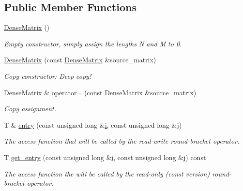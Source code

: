 \subsection*{Public Member Functions}
\begin{DoxyCompactItemize}
\item 
\hyperlink{classoomph_1_1DenseMatrix_aecfca835918b50b607e080fc706b6fcf}{Dense\+Matrix} ()
\begin{DoxyCompactList}\small\item\em Empty constructor, simply assign the lengths N and M to 0. \end{DoxyCompactList}\item 
\hyperlink{classoomph_1_1DenseMatrix_a1d8bf7ffb6cc91b882be17b25ff6d452}{Dense\+Matrix} (const \hyperlink{classoomph_1_1DenseMatrix}{Dense\+Matrix} \&source\+\_\+matrix)
\begin{DoxyCompactList}\small\item\em Copy constructor\+: Deep copy! \end{DoxyCompactList}\item 
\hyperlink{classoomph_1_1DenseMatrix}{Dense\+Matrix} \& \hyperlink{classoomph_1_1DenseMatrix_a01cb48599a5ecdfca9fd02bcdd43bf88}{operator=} (const \hyperlink{classoomph_1_1DenseMatrix}{Dense\+Matrix} \&source\+\_\+matrix)
\begin{DoxyCompactList}\small\item\em Copy assignment. \end{DoxyCompactList}\item 
T \& \hyperlink{classoomph_1_1DenseMatrix_a0260bf942b1ca7d05515bda03acfe8ec}{entry} (const unsigned long \&\hyperlink{cfortran_8h_adb50e893b86b3e55e751a42eab3cba82}{i}, const unsigned long \&j)
\begin{DoxyCompactList}\small\item\em The access function that will be called by the read-\/write round-\/bracket operator. \end{DoxyCompactList}\item 
T \hyperlink{classoomph_1_1DenseMatrix_a0b03682b4c7d8f820599bd2681a01ee0}{get\+\_\+entry} (const unsigned long \&\hyperlink{cfortran_8h_adb50e893b86b3e55e751a42eab3cba82}{i}, const unsigned long \&j) const
\begin{DoxyCompactList}\small\item\em The access function the will be called by the read-\/only (const version) round-\/bracket operator. \end{DoxyCompactList}\item 

\end{DoxyCompactItemize}
